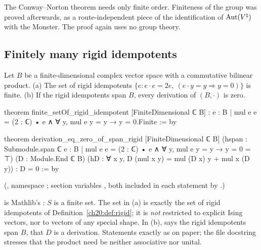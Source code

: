 The Conway--Norton theorem needs only finite order.  Finiteness of the group was proved afterwards, as a
route-independent piece of the identification of $\operatorname{Aut}({V^{\natural}})$ with the Monster.  The proof again uses no group theory.

\subsection{Finitely many rigid idempotents}

\begin{theorem}\label{ch20:thm:finrigid}
Let $B$ be a finite-dimensional complex vector space with a commutative bilinear product.  (a) The set of rigid
idempotents $\{e: e\cdot e=2e,\ (e\cdot y=y\Rightarrow y=0)\}$ is finite.  (b) If the rigid idempotents span $B$, every
derivation of $(B,\cdot)$ is zero.
\end{theorem}
\begin{leancode}
theorem finite_setOf_rigid_idempotent [FiniteDimensional ℂ B] :
    {e : B | mul e e = (2 : ℂ) • e ∧ ∀ y, mul e y = y → y = 0}.Finite := by

theorem derivation_eq_zero_of_span_rigid [FiniteDimensional ℂ B]
    (hspan : Submodule.span ℂ
      {e : B | mul e e = (2 : ℂ) • e ∧ ∀ y, mul e y = y → y = 0} = ⊤)
    (D : Module.End ℂ B)
    (hD : ∀ x y, D (mul x y) = mul (D x) y + mul x (D y)) : D = 0 := by
\end{leancode}
(, namespace ; section variables
, both included in each statement by
.)
\begin{dictionary}
 is Mathlib's : $S$ is a finite set.  The set in (a) is exactly the set of rigid
idempotents of Definition~\ref{ch20:def:rigid}; it is \emph{not} restricted to explicit Ising vectors, nor to vectors of any
special shape.  In (b),  says the rigid idempotents span $B$,  that $D$ is a derivation.  Statements
exactly as on paper; the file docstring stresses that the product need be neither associative nor unital.
\end{dictionary}
